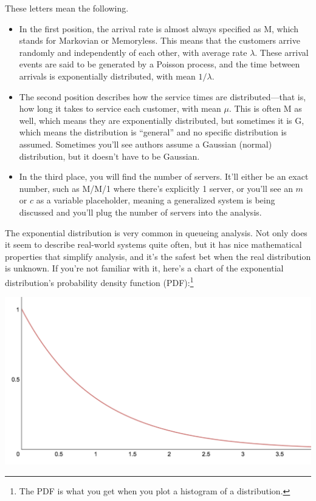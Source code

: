 \documentclass{vivid_layout_pdf}
\begin{document}
These letters mean the following.

\begin{itemize}
\item In the first position, the arrival rate is almost always specified as M, which stands for Markovian or Memoryless. This means that the customers arrive randomly and independently of each other, with average rate \( \lambda \). These arrival events are said to be generated by a Poisson process, and the time between arrivals is exponentially distributed, with mean \( 1/\lambda \).
\item The second position describes how the service times are distributed---that is, how long it takes to service each customer, with mean \( \mu \). This is often M as well, which means they are exponentially distributed, but sometimes it is G, which means the distribution is ``general'' and no specific distribution is assumed. Sometimes you'll see authors assume a Gaussian (normal) distribution, but it doesn't have to be Gaussian.
\item In the third place, you will find the number of servers. It'll either be an exact number, such as M/M/1 where there's explicitly 1 server, or you'll see an $m$ or $c$ as a variable placeholder, meaning a generalized system is being discussed and you'll plug the number of servers into the analysis.
\end{itemize}

The exponential distribution is very common in queueing analysis. Not only does it seem to describe real-world systems quite often, but it has nice mathematical properties that simplify analysis, and it's the safest bet when the real distribution is unknown. If you're not familiar with it, here's a chart of the exponential distribution's probability density function (PDF):\footnote{The PDF is what you get when you plot a histogram of a distribution.}

\begin{center}
\includegraphics[width=.75\linewidth]{queueing-theory/exp}
\end{center}
\end{document}
